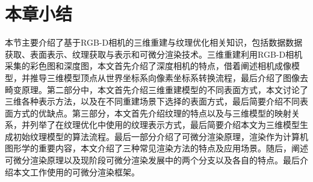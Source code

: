 \section{本章小结}
本节主要介绍了基于RGB-D相机的三维重建与纹理优化相关知识，包括数据数据获取、表面表示、纹理获取与表示和可微分渲染技术。三维重建利用RGB-D相机采集的彩色图和深度图，本文首先介绍了深度相机的特点，借着阐述相机成像模型，并推导三维模型顶点从世界坐标系向像素坐标系转换流程，最后介绍了图像去畸变原理。第二部分中，本文首先介绍三维重建模型的不同表面方式，本文讨论了三维各种表示方法，以及在不同重建场景下选择的表面方式，最后简要介绍不同表面方式的优缺点。第三部分，本文首先介绍纹理的特点以及与三维模型的映射关系，并列举了在纹理优化中使用的纹理表示方式，最后简要介绍本文为三维模型生成初始纹理模型的算法流程。最后一部分介绍了可微分渲染原理，渲染作为计算机图形学的重要内容，本文介绍了三种常见渲染方法的特点及应用场景。随后，阐述可微分渲染原理以及现阶段可微分渲染发展中的两个分支以及各自的特点。最后介绍本文工作使用的可微分渲染框架。
